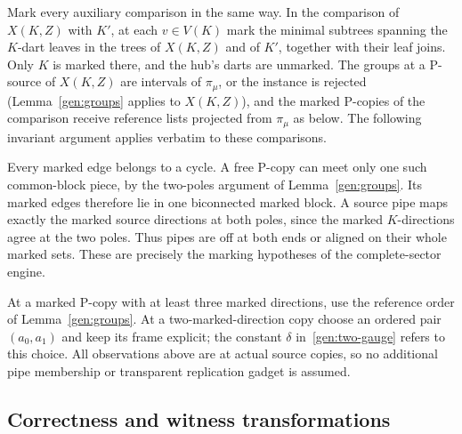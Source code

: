 Mark every auxiliary comparison in the same way.  In the comparison of
$X(K,Z)$ with $K'$, at each $v\in V(K)$ mark the minimal subtrees spanning
the $K$-dart leaves in the trees of $X(K,Z)$ and of $K'$, together with
their leaf joins.  Only $K$ is marked there, and the hub's darts are
unmarked.  The groups at a P-source of $X(K,Z)$ are intervals of $\pi_\mu$,
or the instance is rejected (Lemma~\ref{gen:groups} applies to $X(K,Z)$),
and the marked P-copies of the comparison receive reference lists
projected from $\pi_\mu$ as below.  The following invariant argument
applies verbatim to these comparisons.

Every marked edge belongs to a cycle.  A free P-copy can meet only one
such common-block piece, by the two-poles argument of
Lemma~\ref{gen:groups}.  Its marked edges therefore lie in one
biconnected marked block.  A source pipe maps exactly the marked source
directions at both poles, since the marked $K$-directions agree at the two poles.  Thus pipes are off at both ends or aligned
on their whole marked sets.  These are precisely the marking hypotheses
of the complete-sector engine.

At a marked P-copy with at least three marked directions, use the
reference order of Lemma~\ref{gen:groups}.  At a two-marked-direction copy
choose an ordered pair $(a_0,a_1)$ and keep its frame explicit; the
constant $\delta$ in~\eqref{gen:two-gauge} refers to this choice.  All observations above are at
actual source copies, so no additional pipe membership or transparent
replication gadget is assumed.

\subsection{Correctness and witness transformations}

